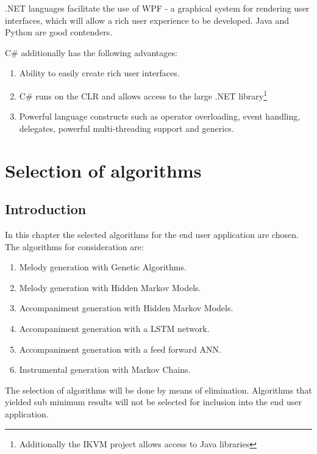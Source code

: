 .NET languages facilitate the use of \ac{WPF} - a graphical system for rendering user interfaces, which will allow a rich user experience to be developed. Java and Python are good contenders.

C\# additionally has the following advantages:
\begin{enumerate}
\item Ability to easily create rich user interfaces.
\item C\# runs on the CLR and allows access to the large .NET library\footnote{Additionally the IKVM project allows access to Java libraries}
\item Powerful language constructs such as operator overloading, event handling, delegates, powerful multi-threading support and generics.
\end{enumerate}


\chapter{Selection of algorithms}
\section{Introduction}
In this chapter the selected algorithms for the end user application are chosen.
The algorithms for consideration are:
\begin{enumerate}
\item Melody generation with Genetic Algorithms.
\item Melody generation with Hidden Markov Models.
\item Accompaniment generation with Hidden Markov Models.
\item Accompaniment generation with a \ac{LSTM} network.
\item Accompaniment generation with a feed forward \ac{ANN}.
\item Instrumental generation with Markov Chains.
\end{enumerate}

The selection of algorithms will be done by means of elimination. Algorithms that yielded sub minimum results will not be selected for inclusion into the end user application.

